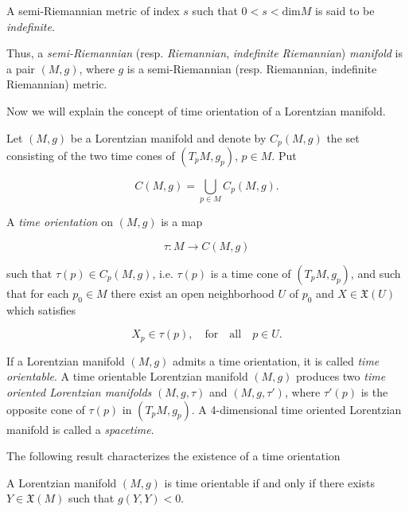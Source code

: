 A semi-Riemannian metric of index $s$ such that $0<s<\mathrm{dim}M$ is said to be \emph{indefinite}.

Thus, a \emph{semi-Riemannian} (resp. \emph{Riemannian}, \emph{indefinite Riemannian}) \emph{manifold} is a pair $(M,g)$, where $g$ is a semi-Riemannian (resp. Riemannian, indefinite Riemannian) metric.





Now we will explain the concept of time orientation of a Lorentzian manifold.

Let $(M,g)$ be a Lorentzian manifold and denote by $C_p(M,g)$ the set consisting of the two time cones of $(T_pM,g_p)$, $p\in M$. Put

\[

C(M,g)=\bigcup_{p\in M} C_p(M,g).

\]

A \emph{time orientation} on $(M,g)$ is a map

\[

\tau : M \longrightarrow C(M,g)

\]

such that $\tau(p)\in C_p(M,g)$, i.e. $\tau(p)$ is a time cone of $(T_pM,g_p)$, and such that for each $p_0\in M$ there exist an open neighborhood $U$ of $p_0$ and $X\in \mathfrak{X}(U)$ which satisfies

\[

X_p \in \tau(p), \quad \mathrm{for \quad all} \quad p\in U.

\]


If a Lorentzian manifold $(M,g)$ admits a time orientation, it is called \emph{time orientable}. A time orientable Lorentzian manifold $(M,g)$ produces two \emph{time oriented Lorentzian manifolds} $(M,g,\tau)$ and $(M,g,\tau ')$, where $\tau '(p)$ is the opposite cone of $\tau(p)$ in $(T_pM,g_p)$. A 4-dimensional time oriented Lorentzian manifold is called a \emph{spacetime}.

\vspace{2mm}

The following result characterizes the existence of a time orientation \cite[Lemma 5.32]{oneill83}

\begin{pro}\label{time_orientable}

A Lorentzian manifold $(M,g)$ is time orientable if and only if there exists $Y\in \mathfrak{X}(M)$ such that $g(Y,Y)<0$.

\end{pro}



